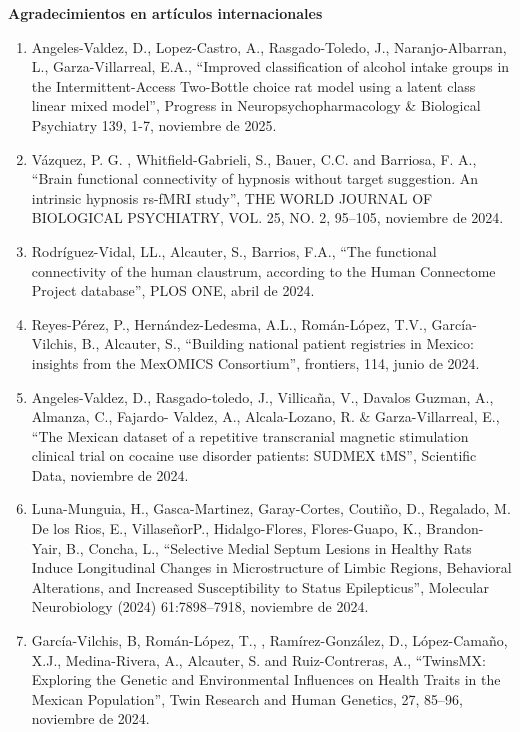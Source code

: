 \textbf{Agradecimientos en artículos internacionales}

\begin{enumerate}
\item Angeles-Valdez, D., Lopez-Castro, A., Rasgado-Toledo, J., Naranjo-Albarran, L., Garza-Villarreal, E.A., “Improved 
classification of alcohol intake groups in the Intermittent-Access Two-Bottle choice rat model using a latent class linear 
mixed model”, Progress in Neuropsychopharmacology \& Biological Psychiatry 139, 1-7, noviembre de 2025.

\item Vázquez, P. G. , Whitfield-Gabrieli, S., Bauer, C.C. and Barriosa, F. A., “Brain functional connectivity of hypnosis 
without target suggestion. An intrinsic hypnosis rs-fMRI study”, THE WORLD JOURNAL OF BIOLOGICAL PSYCHIATRY, VOL. 25, NO. 2, 
95–105,    noviembre de 2024.

\item Rodríguez-Vidal, LL., Alcauter, S., Barrios, F.A., “The functional connectivity of the human claustrum, according to 
the 
Human Connectome Project database”, PLOS ONE,    abril de 2024.

\item Reyes-Pérez, P., Hernández-Ledesma, A.L., Román-López, T.V., García-Vilchis, B., Alcauter, S., “Building national 
patient 
registries in Mexico: insights from the MexOMICS Consortium”, frontiers, 114,    junio de 
2024.

\item Angeles-Valdez, D., Rasgado-toledo, J., Villicaña, V., Davalos Guzman, A., Almanza, C., Fajardo-
Valdez, A., Alcala-Lozano, R. \& Garza-Villarreal, E., “The Mexican dataset of a repetitive transcranial magnetic stimulation 
clinical trial on cocaine use disorder patients: SUDMEX tMS”, Scientific Data,    noviembre 
de 2024.

\item Luna-Munguia, H., Gasca-Martinez, Garay-Cortes, Coutiño, D., Regalado, M. De los Rios, E., VillaseñorP., 
Hidalgo-Flores, 
Flores-Guapo, K., Brandon-Yair, B., Concha, L., “Selective Medial Septum Lesions in Healthy Rats Induce Longitudinal Changes 
in Microstructure of Limbic Regions, Behavioral Alterations, and Increased Susceptibility to Status Epilepticus”, Molecular 
Neurobiology (2024) 61:7898–7918,    noviembre de 2024.

\item García-Vilchis, B, Román-López, T., , Ramírez-González, D., López-Camaño, X.J., Medina-Rivera, A., Alcauter, S. and 
Ruiz-Contreras, A., “TwinsMX: Exploring the Genetic and Environmental Influences on Health Traits in the Mexican Population”, 
Twin Research and Human Genetics, 27, 85–96,    noviembre de 2024.


\end{enumerate}
